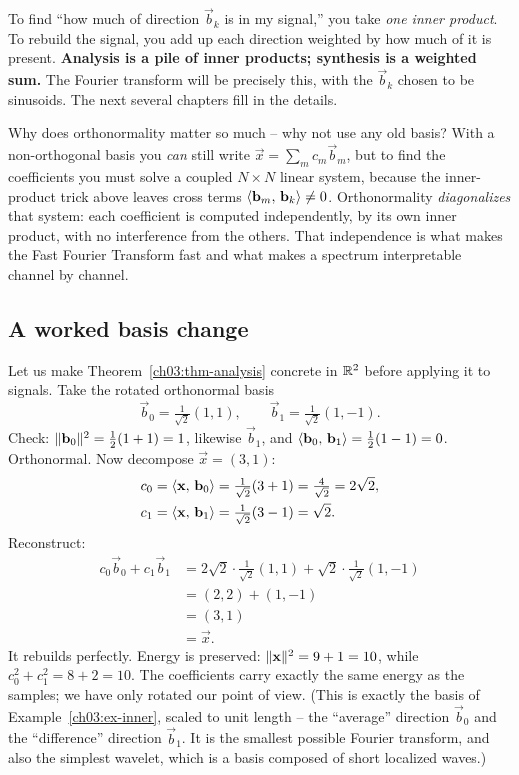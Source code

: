 \begin{happeningbox}
To find ``how much of direction $\vec{b}_k$ is in my signal,'' you take
\emph{one inner product}. To rebuild the signal, you add up each direction weighted by how much of it
is present. \textbf{Analysis is a pile of inner products; synthesis is a weighted sum.} The Fourier
transform will be precisely this, with the $\vec{b}_k$ chosen to be sinusoids. The next several chapters fill in
the details.
\end{happeningbox}

\begin{whybox}
Why does orthonormality matter so much -- why not use any old basis? With a non-orthogonal basis you
\emph{can} still write $\vec{x}=\sum_m c_m \vec{b}_m$, but to find the coefficients you must solve a
coupled $N\times N$ linear system, because the inner-product trick above leaves cross terms
$\langle \mathbf{b}_m,\, \mathbf{b}_k \rangle\neq 0$. Orthonormality \emph{diagonalizes} that system: each
coefficient is computed independently, by its own inner product, with no interference from the
others. That independence is what makes the Fast Fourier Transform fast and what makes a spectrum
interpretable channel by channel.
\end{whybox}

\subsection{A worked basis change}
\label{ch03:basis-change}

Let us make Theorem~\ref{ch03:thm-analysis} concrete in $\mathbb{R}^2$ before applying it to signals. Take
the rotated orthonormal basis
\[
  \vec{b}_0 = \tfrac{1}{\sqrt2}(1,1), \qquad \vec{b}_1 = \tfrac{1}{\sqrt2}(1,-1).
\]
Check: $\lVert\mathbf{b}_0\rVert^2 = \tfrac12(1+1)=1$, likewise $\vec{b}_1$, and
$\langle \mathbf{b}_0,\, \mathbf{b}_1 \rangle = \tfrac12(1-1)=0$. Orthonormal. Now decompose $\vec{x}=(3,1)$:
\begin{align*}
  c_0 &= \langle \mathbf{x},\, \mathbf{b}_0 \rangle = \tfrac{1}{\sqrt2}(3+1)=\tfrac{4}{\sqrt2}=2\sqrt2,\\
  c_1 &= \langle \mathbf{x},\, \mathbf{b}_1 \rangle = \tfrac{1}{\sqrt2}(3-1)=\sqrt2 .
\end{align*}
Reconstruct: 
\begin{align*}
  c_0\vec{b}_0 + c_1\vec{b}_1 &= 2\sqrt2\cdot\tfrac{1}{\sqrt2}(1,1) + \sqrt2\cdot\tfrac{1}{\sqrt2}(1,-1) \\
  &= (2,2)+(1,-1) \\
  &= (3,1) \\
  &= \vec{x} .
\end{align*}
It rebuilds perfectly. Energy is preserved: $\lVert\mathbf{x}\rVert^2 = 9+1 = 10$, while
$c_0^2 + c_1^2 = 8 + 2 = 10$. The coefficients carry exactly the same energy as the samples; we have
only rotated our point of view. (This is exactly the basis of Example~\ref{ch03:ex-inner}, scaled to
unit length -- the ``average'' direction $\vec b_0$ and the ``difference'' direction $\vec b_1$. It
is the smallest possible Fourier transform, and also the simplest wavelet, which is a basis composed of short localized waves.)


